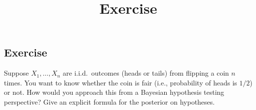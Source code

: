\documentclass[12pt]{article}
\title{Exercise}
\author{}
\date{}
\begin{document}
\maketitle


\subsection*{Exercise}
Suppose $X_1,\ldots,X_n$ are i.i.d.\ outcomes (heads or tails) from flipping a coin $n$ times.
You want to know whether the coin is fair (i.e., probability of heads is $1/2$) or not.
How would you approach this from a Bayesian hypothesis testing perspective?
Give an explicit formula for the posterior on hypotheses.
\end{document}
